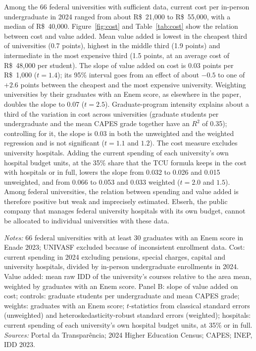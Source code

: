 \documentclass[11pt,a4paper]{article}
\begin{document}
Among the 66 federal universities with sufficient data, current cost per in-person undergraduate in 2024 ranged from about R\$~21,000 to R\$~55,000, with a median of R\$~40,000. Figure~\ref{fig:cost} and Table~\ref{tab:cost} show the relation between cost and value added. Mean value added is lowest in the cheapest third of universities (0.7 points), highest in the middle third (1.9 points) and intermediate in the most expensive third (1.5 points, at an average cost of R\$~48,000 per student). The slope of value added on cost is 0.03 points per R\$~1,000 ($t=1.4$); its 95\% interval goes from an effect of about $-0.5$ to one of $+2.6$ points between the cheapest and the most expensive university. Weighting universities by their graduates with an Enem score, as elsewhere in the paper, doubles the slope to 0.07 ($t=2.5$). Graduate-program intensity explains about a third of the variation in cost across universities (graduate students per undergraduate and the mean CAPES grade together have an $R^2$ of 0.35); controlling for it, the slope is 0.03 in both the unweighted and the weighted regression and is not significant ($t=1.1$ and $1.2$). The cost measure excludes university hospitals. Adding the current spending of each university's own hospital budget units, at the 35\% share that the TCU formula keeps in the cost with hospitals \citep{tcu2010} or in full, lowers the slope from 0.032 to 0.026 and 0.015 unweighted, and from 0.066 to 0.053 and 0.033 weighted ($t=2.0$ and $1.5$). Among federal universities, the relation between spending and value added is therefore positive but weak and imprecisely estimated. Ebserh, the public company that manages federal university hospitals with its own budget, cannot be allocated to individual universities with these data.

\begin{table}[!htbp]
\centering\small
\caption{Cost per student and value added, federal universities}\label{tab:cost}
\resizebox{\linewidth}{!}{}
\begin{minipage}{\linewidth}\vspace{0.4em}\scriptsize
\textit{Notes:} 66 federal universities with at least 30 graduates with an Enem score in Enade 2023; UNIVASF excluded because of inconsistent enrollment data. Cost: current spending in 2024 excluding pensions, special charges, capital and university hospitals, divided by in-person undergraduate enrollments in 2024. Value added: mean raw IDD of the university's courses relative to the area mean, weighted by graduates with an Enem score. Panel B: slope of value added on cost; controls: graduate students per undergraduate and mean CAPES grade; weights: graduates with an Enem score; $t$-statistics from classical standard errors (unweighted) and heteroskedasticity-robust standard errors (weighted); hospitals: current spending of each university's own hospital budget units, at 35\% or in full. \textit{Sources:} Portal da Transpar\^encia; 2024 Higher Education Census; CAPES; INEP, IDD 2023.
\end{minipage}
\end{table}
\end{document}

